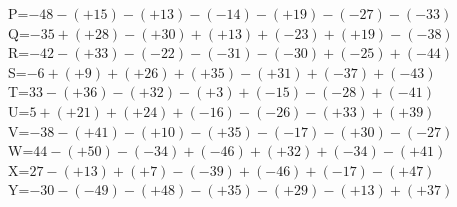 \documentclass{article}%
\begin{document}
\vspace{0.35cm}%
P=$-48-(+15)-(+13)-(-14)-(+19)-(-27)-(-33)$\\%
\vspace{0.35cm}%
Q=$-35+(+28)-(+30)+(+13)+(-23)+(+19)-(-38)$\\%
\vspace{0.35cm}%
R=$-42-(+33)-(-22)-(-31)-(-30)+(-25)+(-44)$\\%
\vspace{0.35cm}%
S=$-6+(+9)+(+26)+(+35)-(+31)+(-37)+(-43)$\\%
\vspace{0.35cm}%
T=$33-(+36)-(+32)-(+3)+(-15)-(-28)+(-41)$\\%
\vspace{0.35cm}%
U=$5+(+21)+(+24)+(-16)-(-26)-(+33)+(+39)$\\%
\vspace{0.35cm}%
V=$-38-(+41)-(+10)-(+35)-(-17)-(+30)-(-27)$\\%
\vspace{0.35cm}%
W=$44-(+50)-(-34)+(-46)+(+32)+(-34)-(+41)$\\%
\vspace{0.35cm}%
X=$27-(+13)+(+7)-(-39)+(-46)+(-17)-(+47)$\\%
\vspace{0.35cm}%
Y=$-30-(-49)-(+48)-(+35)-(+29)-(+13)+(+37)$\\%
\vspace{0.35cm}

%
\newpage%
\end{document}
